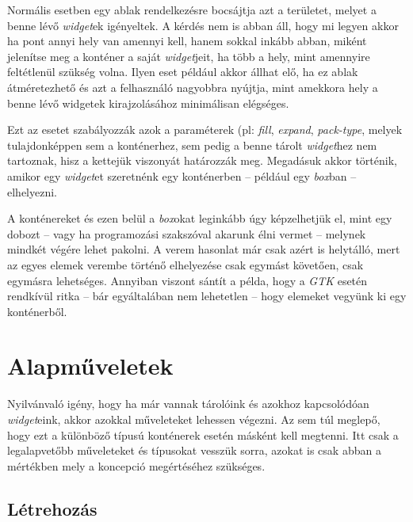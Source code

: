 Normális esetben egy ablak rendelkezésre bocsájtja azt a területet, melyet a benne lévő \textit{widget}ek igényeltek. A kérdés nem is abban  áll, hogy mi legyen akkor ha pont annyi hely van amennyi kell, hanem sokkal inkább abban, miként jelenítse meg a konténer a saját \textit{widget}jeit, ha több a hely, mint amennyire feltétlenül szükség volna. Ilyen eset például akkor állhat elő, ha ez ablak átméretezhető és azt a felhasználó nagyobbra nyújtja, mint amekkora hely a benne lévő widgetek kirajzolásához minimálisan elégséges.

Ezt az esetet szabályozzák azok a paraméterek (pl: \textit{fill}, \textit{expand}, \textit{pack-type}, melyek tulajdonképpen sem a konténerhez, sem pedig a benne tárolt \textit{widget}hez nem tartoznak, hisz a kettejük viszonyát határozzák meg. Megadásuk akkor történik, amikor egy \textit{widget}et szeretnénk egy konténerben -- például egy \textit{box}ban -- elhelyezni.

A konténereket és ezen belül a \textit{box}okat leginkább úgy képzelhetjük el, mint egy dobozt -- vagy ha programozási szakszóval akarunk élni vermet -- melynek mindkét végére lehet pakolni. A verem hasonlat már csak azért is helytálló, mert az egyes elemek verembe történő elhelyezése csak egymást követően, csak egymásra lehetséges. Annyiban viszont sántít a példa, hogy a \textit{GTK} esetén rendkívül ritka -- bár egyáltalában nem lehetetlen -- hogy elemeket vegyünk ki egy konténerből.

\section{Alapműveletek}

Nyilvánvaló igény, hogy ha már vannak tárolóink és azokhoz kapcsolódóan \textit{widget}eink, akkor azokkal műveleteket lehessen végezni. Az sem túl meglepő, hogy ezt a különböző típusú konténerek esetén másként kell megtenni. Itt csak a legalapvetőbb műveleteket és típusokat vesszük sorra, azokat is csak abban a mértékben mely a koncepció megértéséhez szükséges.

\subsection{Létrehozás}

